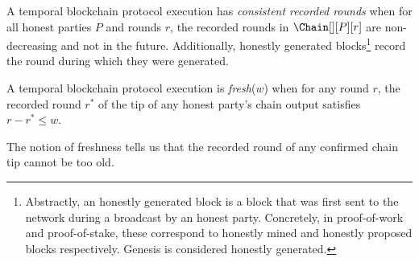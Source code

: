 \begin{definition}
  A temporal blockchain protocol execution has \emph{consistent recorded rounds}
  when for all honest parties $P$ and rounds $r$,
  the recorded rounds in $\Chain[][P][r]$ are non-decreasing and not
  in the future.
  Additionally, honestly generated blocks\footnote{
    Abstractly, an honestly generated block is a block that was first
    sent to the network during a broadcast by an honest party. Concretely, in proof-of-work
    and proof-of-stake, these correspond to honestly mined and honestly
    proposed blocks respectively. Genesis is considered honestly generated.
  } record the round during which
  they were generated.
\end{definition}

\begin{definition}[Freshness] \label{def:tip-freshness}
  A temporal blockchain protocol execution is \emph{fresh}($w$) when for
  any round $r$, the recorded round
  $r^*$ of the tip of any honest party's chain output
  satisfies $r - r^* \leq w$.
\end{definition}

The notion of freshness tells us that the recorded round
of any confirmed chain tip cannot be too old.

